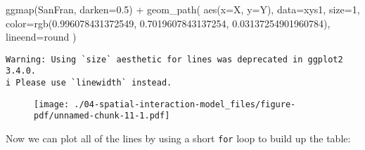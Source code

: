 \documentclass[
  letterpaper,
  krantz2]{style/krantz}
\newenvironment{Shaded}{\begin{snugshade}}{\end{snugshade}}
\newcommand{\AttributeTok}[1]{\textcolor[rgb]{0.40,0.45,0.13}{#1}}
\newcommand{\DecValTok}[1]{\textcolor[rgb]{0.68,0.00,0.00}{#1}}
\newcommand{\FloatTok}[1]{\textcolor[rgb]{0.68,0.00,0.00}{#1}}
\newcommand{\FunctionTok}[1]{\textcolor[rgb]{0.28,0.35,0.67}{#1}}
\newcommand{\NormalTok}[1]{\textcolor[rgb]{0.00,0.23,0.31}{#1}}
\newcommand{\SpecialCharTok}[1]{\textcolor[rgb]{0.37,0.37,0.37}{#1}}
\newcommand{\StringTok}[1]{\textcolor[rgb]{0.13,0.47,0.30}{#1}}
\begin{document}
\begin{Shaded}
\begin{Highlighting}[]
\FunctionTok{ggmap}\NormalTok{(SanFran, }\AttributeTok{darken=}\FloatTok{0.5}\NormalTok{) }\SpecialCharTok{+} 
  \FunctionTok{geom\_path}\NormalTok{(}
    \FunctionTok{aes}\NormalTok{(}\AttributeTok{x=}\NormalTok{X, }\AttributeTok{y=}\NormalTok{Y), }
    \AttributeTok{data=}\NormalTok{xys1,}
    \AttributeTok{size=}\DecValTok{1}\NormalTok{,}
    \AttributeTok{color=}\FunctionTok{rgb}\NormalTok{(}\FloatTok{0.996078431372549}\NormalTok{, }\FloatTok{0.7019607843137254}\NormalTok{, }\FloatTok{0.03137254901960784}\NormalTok{),}
    \AttributeTok{lineend=}\StringTok{\textquotesingle{}round\textquotesingle{}}
\NormalTok{    )}
\end{Highlighting}
\end{Shaded}

\begin{verbatim}
Warning: Using `size` aesthetic for lines was deprecated in ggplot2 3.4.0.
i Please use `linewidth` instead.
\end{verbatim}

\begin{figure}[H]

{\centering \texttt{[image: ./04-spatial-interaction-model\_files/figure-pdf/unnamed-chunk-11-1.pdf]}

}

\end{figure}

Now we can plot all of the lines by using a short \texttt{for} loop to
build up the table:
\end{document}
